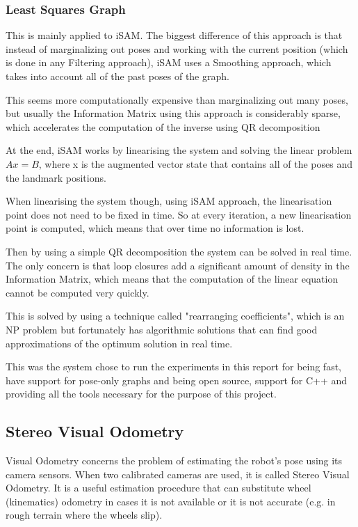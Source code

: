 \documentclass[11pt]{article}
\begin{document}
	\subsubsection{Least Squares Graph}
This is mainly applied to iSAM. The biggest difference of this approach is that instead of marginalizing out poses and working with the current position (which is done in any Filtering approach), iSAM uses a Smoothing approach, which takes into account all of the past poses of the graph.

This seems more computationally expensive than marginalizing out many poses, but usually the Information Matrix using this approach is considerably sparse, which accelerates the computation of the inverse using QR decomposition

At the end, iSAM works by linearising the system and solving the linear problem $Ax = B$, where x is the augmented vector state that contains all of the poses and the landmark positions.

When linearising the system though, using iSAM approach, the linearisation point does not need to be fixed in time. So at every iteration, a new linearisation point is computed, which means that over time no information is lost.

Then by using a simple QR decomposition the system can be solved in real time. The only concern is that loop closures add a significant amount of density in the Information Matrix, which means that the computation of the linear equation cannot be computed very quickly.

This is solved by using a technique called "rearranging  coefficients", which is an NP problem but fortunately has algorithmic solutions that can find good approximations of the optimum solution in real time.

This was the system chose to run the experiments in this report for being fast, have support for pose-only graphs and being open source, support for C++ and providing all the tools necessary for the purpose of this project.

	
	\subsection{Stereo Visual Odometry}

Visual Odometry concerns the problem of estimating the robot's pose using its camera sensors. When two calibrated cameras are used, it is called Stereo Visual Odometry. It is a useful estimation procedure that can substitute wheel (kinematics) odometry in cases it is not available or it is not accurate (e.g. in rough terrain where the wheels slip).
	
\end{document}
